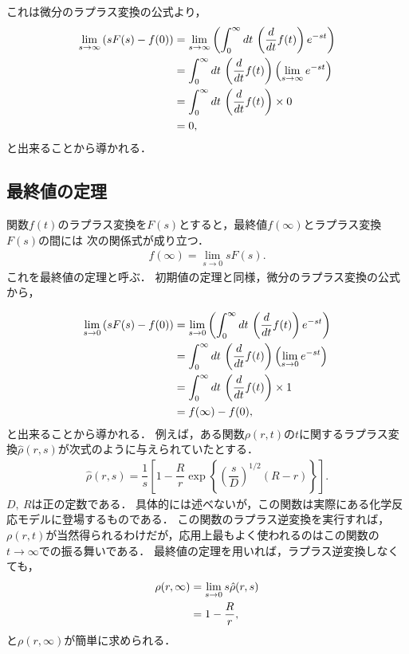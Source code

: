 これは微分のラプラス変換の公式より，
\begin{align}
  \lim_{s\to\infty}\left(sF(s)-f(0)\right)
  &=\lim_{s\to\infty}\left(\int_{0}^{\infty}dt\,\left(\dfrac{d}{dt}f(t)\right)e^{-st}\right) \notag \\
  &=\int_{0}^{\infty}dt\,\left(\dfrac{d}{dt}f(t)\right)\left(\lim_{s\to \infty}e^{-st}\right) \notag \\
  &= \int_{0}^{\infty}dt\,\left(\dfrac{d}{dt}f(t)\right)\times 0 \notag \\
  &=0,
\end{align}
と出来ることから導かれる．
%
\subsection{最終値の定理}
%
関数$f(t)$のラプラス変換を$F(s)$とすると，最終値$f(\infty)$とラプラス変換$F(s)$の間には
次の関係式が成り立つ．
\begin{align}
 f(\infty) = \lim_{s\to 0}sF(s). 
\end{align}
これを最終値の定理と呼ぶ．
初期値の定理と同様，微分のラプラス変換の公式から，

\begin{align}
  \lim_{s\to0}\left(sF(s)-f(0)\right)
  &=\lim_{s\to 0}\left(\int_{0}^{\infty}dt\,\left(\dfrac{d}{dt}f(t)\right)e^{-st}\right) \notag \\
  &=\int_{0}^{\infty}dt\,\left(\dfrac{d}{dt}f(t)\right)\left(\lim_{s\to 0}e^{-st}\right) \notag \\
  &= \int_{0}^{\infty}dt\,\left(\dfrac{d}{dt}f(t)\right)\times 1 \notag \\
  &=f(\infty)-f(0),
\end{align}
と出来ることから導かれる．
%
%
例えば，ある関数$\rho(r,t)$の$t$に関するラプラス変換$\hat{\rho}(r,s)$が次式のように与えられていたとする．
\begin{align}
 \hat{\rho}(r,s) = \dfrac{1}{s}\left[1-\dfrac{R}{r}\exp\left\{\left(\dfrac{s}{D}\right)^{1/2}(R-r)\right\}\right]. 
\end{align}
$D,~R$は正の定数である．
具体的には述べないが，この関数は実際にある化学反応モデルに登場するものである．
この関数のラプラス逆変換を実行すれば，$\rho(r,t)$が当然得られるわけだが，応用上最もよく使われるのはこの関数の
$t\to \infty$での振る舞いである．
最終値の定理を用いれば，ラプラス逆変換しなくても，
\begin{align}
 \rho(r,\infty) 
  & = \lim_{s\to 0} s\hat{\rho}(r,s) \notag \\
  & = 1- \dfrac{R}{r}, 
\end{align}
と$\rho(r,\infty)$が簡単に求められる．